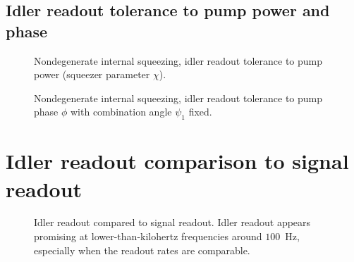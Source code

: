 \subsection{Idler readout tolerance to pump power and phase}


\begin{figure}
	\centering
	\caption{Nondegenerate internal squeezing, idler readout tolerance to pump power (squeezer parameter $\chi$).}
	\label{fig:}
\end{figure}


\begin{figure}
	\centering
	\caption{Nondegenerate internal squeezing, idler readout tolerance to pump phase $\phi$ with combination angle $\psi_1$ fixed.}
	\label{fig:}
\end{figure}


\section{Idler readout comparison to signal readout}



\begin{figure}
	\centering
	\caption{Idler readout compared to signal readout. Idler readout appears promising at lower-than-kilohertz frequencies around $100$~Hz, especially when the readout rates are comparable. }
	\label{fig:}
\end{figure}

